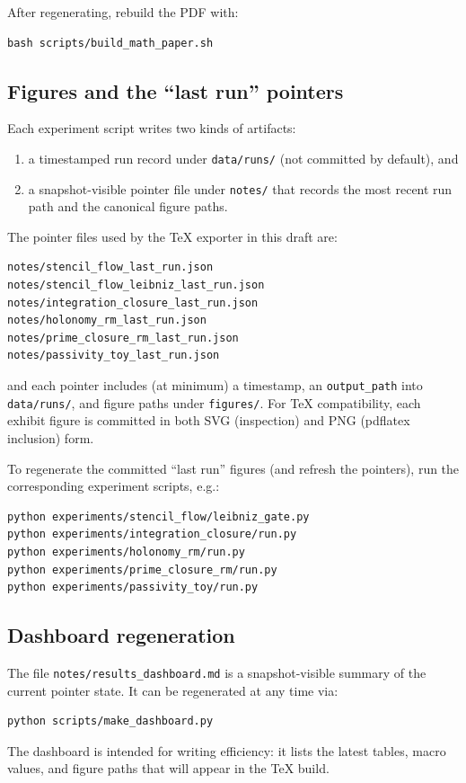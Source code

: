 \documentclass[apajournal,article,submit,moreauthors,pdftex]{Definitions/mdpi}
\begin{document}
After regenerating, rebuild the PDF with:
\begin{verbatim}
bash scripts/build_math_paper.sh
\end{verbatim}

\subsection{Figures and the ``last run'' pointers}
Each experiment script writes two kinds of artifacts:
\begin{enumerate}
  \item a timestamped run record under \texttt{data/runs/} (not committed by default), and
  \item a snapshot-visible pointer file under \texttt{notes/} that records the most recent run path and the canonical figure paths.
\end{enumerate}
The pointer files used by the TeX exporter in this draft are:
\begin{verbatim}
notes/stencil_flow_last_run.json
notes/stencil_flow_leibniz_last_run.json
notes/integration_closure_last_run.json
notes/holonomy_rm_last_run.json
notes/prime_closure_rm_last_run.json
notes/passivity_toy_last_run.json
\end{verbatim}
and each pointer includes (at minimum) a timestamp, an \texttt{output\_path} into \texttt{data/runs/}, and figure paths under \texttt{figures/}.
For TeX compatibility, each exhibit figure is committed in both SVG (inspection) and PNG (pdflatex inclusion) form.

To regenerate the committed ``last run'' figures (and refresh the pointers), run the corresponding experiment scripts, e.g.:
\begin{verbatim}
python experiments/stencil_flow/leibniz_gate.py
python experiments/integration_closure/run.py
python experiments/holonomy_rm/run.py
python experiments/prime_closure_rm/run.py
python experiments/passivity_toy/run.py
\end{verbatim}

\subsection{Dashboard regeneration}
The file \texttt{notes/results\_dashboard.md} is a snapshot-visible summary of the current pointer state.
It can be regenerated at any time via:
\begin{verbatim}
python scripts/make_dashboard.py
\end{verbatim}
The dashboard is intended for writing efficiency: it lists the latest tables, macro values, and figure paths that will appear in the TeX build.
\end{document}
